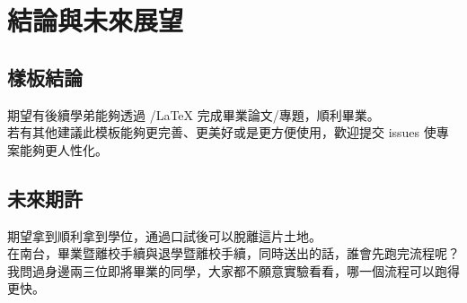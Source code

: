 
\chapter{結論與未來展望}\label{conclusion}

\section{樣板結論}

期望有後續學弟能夠透過 /LaTeX 完成畢業論文/專題，順利畢業。\\
若有其他建議此模板能夠更完善、更美好或是更方便使用，歡迎提交 issues 使專案能夠更人性化。

\section{未來期許}

期望拿到順利拿到學位，通過口試後可以脫離這片土地。\\
在南台，畢業暨離校手續與退學暨離校手續，同時送出的話，誰會先跑完流程呢？我問過身邊兩三位即將畢業的同學，大家都不願意實驗看看，哪一個流程可以跑得更快。
